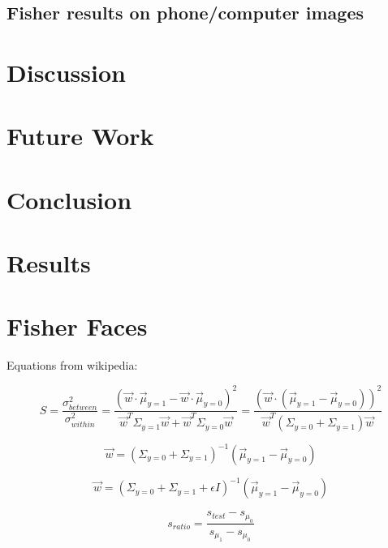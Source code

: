 \subsection{Fisher results on phone/computer images}



\section{Discussion} %



\section{Future Work} %



\section{Conclusion}











\section{Results}




\section{Fisher Faces}

Equations from wikipedia:

\begin{equation}
S=\frac{\sigma_{between}^2}{\sigma_{within}^2}= \frac{(\vec w \cdot \vec \mu_{y=1} - \vec w \cdot \vec \mu_{y=0})^2}{\vec w^T \Sigma_{y=1} \vec w + \vec w^T \Sigma_{y=0} \vec w} = \frac{(\vec w \cdot (\vec \mu_{y=1} - \vec \mu_{y=0}))^2}{\vec w^T (\Sigma_{y=0}+\Sigma_{y=1}) \vec w}
\end{equation}

\begin{equation}
\vec w = (\Sigma_{y=0}+\Sigma_{y=1})^{-1}(\vec \mu_{y=1} - \vec \mu_{y=0})
\end{equation}

\begin{equation}
\vec w = (\Sigma_{y=0} + \Sigma_{y=1} + \epsilon I)^{-1}(\vec \mu_{y=1} - \vec \mu_{y=0})
\end{equation}


\begin{equation}
s_{ratio} = \frac{s_{test} - s_{\mu_0}}{s_{\mu_1} - s_{\mu_0}}
\end{equation}
